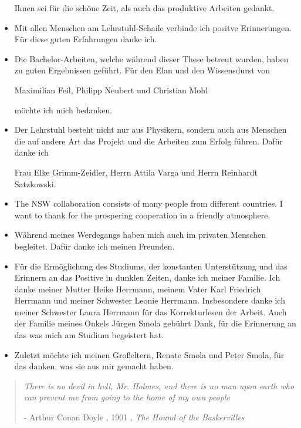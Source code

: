 \documentclass[
twoside,            %
BCOR1.4cm,          %
10pt,               %
headings=normal,    %
headsepline,        %
clearplainpage,		%
final,              %
div=14,
open=right,
bibliography=toc
]{scrreprt}
\begin{document}
\begin{itemize}
		Ihnen sei f\"ur die sch\"one Zeit, als auch das produktive Arbeiten gedankt.
	\item
		Mit allen Menschen am Lehrstuhl-Schaile verbinde ich positve Erinnerungen.
		F\"ur diese guten Erfahrungen danke ich.
	\item
		Die Bachelor-Arbeiten, welche w\"ahrend dieser These betreut wurden, haben zu guten Ergebnissen gef\"uhrt.
		F\"ur den Elan und den Wissensdurst von
		
		Maximilian Feil, Philipp Neubert und Christian Mohl
		
		m\"ochte ich mich bedanken.
	\item
		Der Lehrstuhl besteht nicht nur aus Physikern, sondern auch aus Menschen die auf andere Art das Projekt und die Arbeiten zum Erfolg f\"uhren.
		Daf\"ur danke ich
		
		Frau Elke Grimm-Zeidler, Herrn Attila Varga und Herrn Reinhardt Satzkowski.
	\item
		The NSW collaboration consists of many people from different countries.
		I want to thank for the prospering cooperation in a friendly atmosphere.
	\item
		W\"ahrend meines Werdegangs haben mich auch im privaten Menschen begleitet.
		Daf\"ur danke ich meinen Freunden.
	\item
		F\"ur die Erm\"oglichung des Studiums, der konstanten Unterst\"utzung und das Erinnern an das Positive in dunklen Zeiten, danke ich meiner Familie.
		Ich danke meiner Mutter Heike Herrmann, meinem Vater Karl Friedrich Herrmann und meiner Schwester Leonie Herrmann.
		Insbesondere danke ich meiner Schwester Laura Herrmann f\"ur das Korrekturlesen der Arbeit.
		Auch der Familie meines Onkels J\"urgen Smola geb\"uhrt Dank, f\"ur die Erinnerung an das was mich am Studium begeistert hat.
	\item
		Zuletzt m\"ochte ich meinen Gro\ss eltern, Renate Smola und Peter Smola, f\"ur das danken, was sie aus mir gemacht haben.
\end{itemize}

\vspace*{\fill} 
\begin{quote} 
\textit{
	There is no devil in hell, Mr. Holmes, and there is no man upon earth who can prevent me from going to the home of my own people
}

\hfill - Arthur Conan Doyle , 1901 , \textit{The Hound of the Baskervilles}
\end{quote}
\vspace*{\fill}
\end{document}
